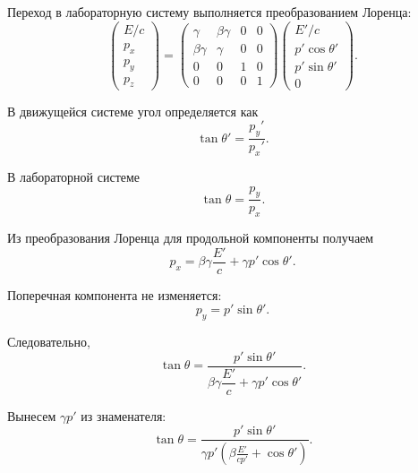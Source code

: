 \documentclass[../final.tex]{subfiles}
\begin{document}
Переход в лабораторную систему выполняется преобразованием Лоренца:
%
\begin{equation*}
    \begin{pmatrix}
        E/c\\
        p_x\\
        p_y\\
        p_z
    \end{pmatrix}
    =
    \begin{pmatrix}
        \gamma      & \beta\gamma & 0 & 0\\
        \beta\gamma & \gamma      & 0 & 0\\
        0           & 0           & 1 & 0\\
        0           & 0           & 0 & 1
    \end{pmatrix}
    \begin{pmatrix}
        E'/c\\
        p'\cos\theta'\\
        p'\sin\theta'\\
        0
    \end{pmatrix}.
\end{equation*}

В движущейся системе угол определяется как
%
\begin{equation*}
    \tan\theta'
    =
    \frac{p_y'}{p_x'}.
\end{equation*}

В лабораторной системе
%
\begin{equation*}
    \tan\theta
    =
    \frac{p_y}{p_x}.
\end{equation*}

Из преобразования Лоренца для продольной компоненты получаем
%
\begin{equation*}
    p_x
    =
    \beta\gamma\frac{E'}{c}
    +
    \gamma p'\cos\theta'.
\end{equation*}

Поперечная компонента не изменяется:
%
\begin{equation*}
    p_y
    =
    p'\sin\theta'.
\end{equation*}

Следовательно,
%
\begin{equation*}
    \tan\theta
    =
    \frac{
        p'\sin\theta'
    }{
        \beta\gamma\dfrac{E'}{c}
        +
        \gamma p'\cos\theta'
    }.
\end{equation*}

Вынесем $\gamma p'$ из знаменателя:
%
\begin{equation*}
    \tan\theta
    =
    \frac{
        p'\sin\theta'
    }{
        \gamma p'
        \left(
            \beta\frac{E'}{cp'}
            +
            \cos\theta'
        \right)
    }.
\end{equation*}
\end{document}
